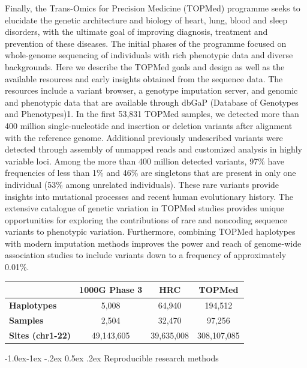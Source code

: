 \documentclass[11pt,]{article}
\makeatletter
\renewcommand\subsubsection{
  \@startsection{subsubsection}{3}{\z@}
    {-1.0ex\@plus -1ex \@minus -.2ex}%
    {0.5ex \@plus .2ex}%
    {\normalfont\normalsize\bf}} %
\makeatother
\begin{document}
Finally, the Trans-Omics for Precision Medicine (TOPMed) programme seeks to elucidate the genetic architecture and biology of heart, lung, blood and sleep disorders, with the ultimate goal of improving diagnosis, treatment and prevention of these diseases.
The initial phases of the programme focused on whole-genome sequencing of individuals with rich phenotypic data and diverse backgrounds.
Here we describe the TOPMed goals and design as well as the available resources and early insights obtained from the sequence data.
The resources include a variant browser, a genotype imputation server, and genomic and phenotypic data that are available through dbGaP (Database of Genotypes and Phenotypes)1.
In the first 53,831 TOPMed samples, we detected more than 400 million single-nucleotide and insertion or deletion variants after alignment with the reference genome.
Additional previously undescribed variants were detected through assembly of unmapped reads and customized analysis in highly variable loci.
Among the more than 400 million detected variants, 97\% have frequencies of less than 1\% and 46\% are singletons that are present in only one individual (53\% among unrelated individuals).
These rare variants provide insights into mutational processes and recent human evolutionary history.
The extensive catalogue of genetic variation in TOPMed studies provides unique opportunities for exploring the contributions of rare and noncoding sequence variants to phenotypic variation.
Furthermore, combining TOPMed haplotypes with modern imputation methods improves the power and reach of genome-wide association studies to include variants down to a frequency of approximately 0.01\%.

\begin{longtable}[]{@{}lccc@{}}
\toprule
& \textbf{1000G Phase 3} & \textbf{HRC} & \textbf{TOPMed} \\
\midrule
\endhead
\textbf{Haplotypes} & 5,008 & 64,940 & 194,512 \\
\textbf{Samples} & 2,504 & 32,470 & 97,256 \\
\textbf{Sites (chr1-22)} & 49,143,605 & 39,635,008 & 308,107,085 \\
\bottomrule
\end{longtable}

\hypertarget{reproducible-research-methods}{%
\subsubsection{Reproducible research methods}\label{reproducible-research-methods}}
\end{document}
